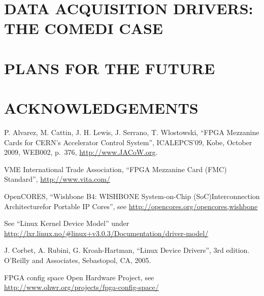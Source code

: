 \documentclass{JAC2003}
\begin{document}
\section{DATA ACQUISITION DRIVERS: THE COMEDI CASE}
\section{PLANS FOR THE FUTURE}
\section{ACKNOWLEDGEMENTS}


\begin{thebibliography}{9}   %

P. Alvarez, M. Cattin, J. H. Lewis, J. Serrano, T. Wlostowski,
``FPGA Mezzanine Cards for CERN’s Accelerator Control System'',
ICALEPCS'09, Kobe, October 2009, WEB002, p.~376,
\url{http://www.JACoW.org}.

VME International Trade Association,
``FPGA Mezzanine Card (FMC) Standard'', \url{http://www.vita.com/}

OpenCORES,
``Wishbone B4: WISHBONE System-on-Chip (SoC)Interconnection
Architecturefor Portable IP Cores'',
see \url{http://opencores.org/opencores,wishbone}

See ``Linux Kernel Device Model''
under \url{http://lxr.linux.no/#linux+v3.0.3/Documentation/driver-model/}

J. Corbet, A. Rubini, G. Kroah-Hartman, ``Linux Device Drivers'', 3rd
edition. O'Reilly and Associates, Sebastopol, CA, 2005.

 FPGA config space Open Hardware
Project, see
\url{http://www.ohwr.org/projects/fpga-config-space/}

\end{thebibliography}
\end{document}
